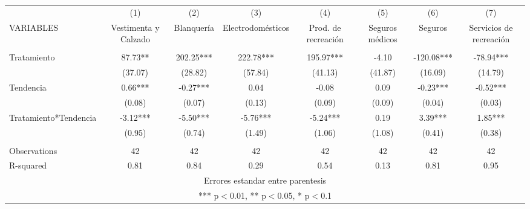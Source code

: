 \documentclass[]{article}
\begin{document}
\begin{tabular}{lccccccc} \hline
 & (1) & (2) & (3) & (4) & (5) & (6) & (7) \\
VARIABLES & Vestimenta y Calzado & Blanquería & Electrodomésticos & Prod. de recreación & Seguros médicos & Seguros & Servicios de recreación \\ \hline
 &  &  &  &  &  &  &  \\
Tratamiento & 87.73** & 202.25*** & 222.78*** & 195.97*** & -4.10 & -120.08*** & -78.94*** \\
 & (37.07) & (28.82) & (57.84) & (41.13) & (41.87) & (16.09) & (14.79) \\
Tendencia & 0.66*** & -0.27*** & 0.04 & -0.08 & 0.09 & -0.23*** & -0.52*** \\
 & (0.08) & (0.07) & (0.13) & (0.09) & (0.09) & (0.04) & (0.03) \\
Tratamiento*Tendencia & -3.12*** & -5.50*** & -5.76*** & -5.24*** & 0.19 & 3.39*** & 1.85*** \\
 & (0.95) & (0.74) & (1.49) & (1.06) & (1.08) & (0.41) & (0.38) \\
 &  &  &  &  &  &  &  \\
Observations & 42 & 42 & 42 & 42 & 42 & 42 & 42 \\
 R-squared & 0.81 & 0.84 & 0.29 & 0.54 & 0.13 & 0.81 & 0.95 \\ \hline
\multicolumn{8}{c}{ Errores estandar entre parentesis} \\
\multicolumn{8}{c}{ *** p$<$0.01, ** p$<$0.05, * p$<$0.1} \\
\end{tabular}
\end{document}
